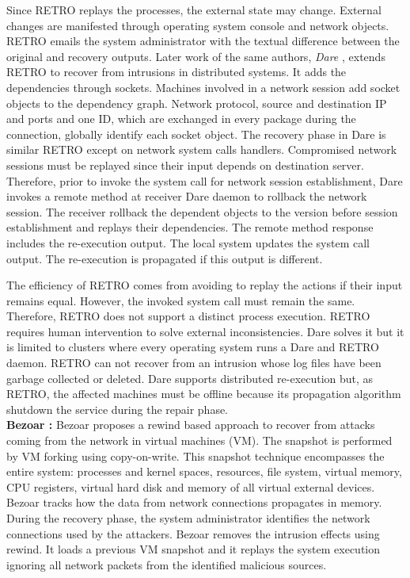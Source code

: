 Since RETRO replays the processes, the external state may change. External changes are manifested through operating system console and network objects. RETRO emails the system administrator with the textual difference between the original and recovery outputs. Later work of the same authors, \textit{Dare} \cite{dare}, extends RETRO to recover from intrusions in distributed systems. It adds the dependencies through sockets. Machines involved in a network session add socket objects to the dependency graph. Network protocol, source and destination \ac{IP} and ports and one ID, which are exchanged in every package during the connection, globally identify each socket object. The recovery phase in Dare is similar RETRO except on network system calls handlers. Compromised network sessions must be replayed since their input depends on destination server. Therefore, prior to invoke the system call for network session establishment, Dare invokes a remote method at receiver Dare daemon to rollback the network session. The receiver rollback the dependent objects to the version before session establishment and replays their dependencies. The remote method response includes the re-execution output. The local system updates the system call output. The re-execution is propagated if this output is different. 

The efficiency of RETRO comes from avoiding to replay the actions if their input remains equal. However, the invoked system call must remain the same. Therefore, RETRO does not support a distinct process execution. RETRO requires human intervention to solve external inconsistencies. Dare solves it but it is limited to clusters where every operating system runs a Dare and RETRO daemon. RETRO can not recover from an intrusion whose log files have been garbage collected or deleted. Dare supports distributed re-execution but, as RETRO, the affected machines must be offline because its propagation algorithm shutdown the service during the repair phase. \\



\textbf{Bezoar \cite{bezoar}:} Bezoar proposes a rewind based approach to recover from attacks coming from the network in virtual machines (VM). The snapshot is performed by \ac{VM} forking using copy-on-write. This snapshot technique encompasses the entire system: processes and kernel spaces, resources, file system, virtual memory, \ac{CPU} registers, virtual hard disk and memory of all virtual external devices. Bezoar tracks how the data from network connections propagates in memory. During the recovery phase, the system administrator identifies the network connections used by the attackers. Bezoar removes the intrusion effects using rewind. It loads a previous \ac{VM} snapshot and it replays the system execution ignoring all network packets from the identified malicious sources. 

